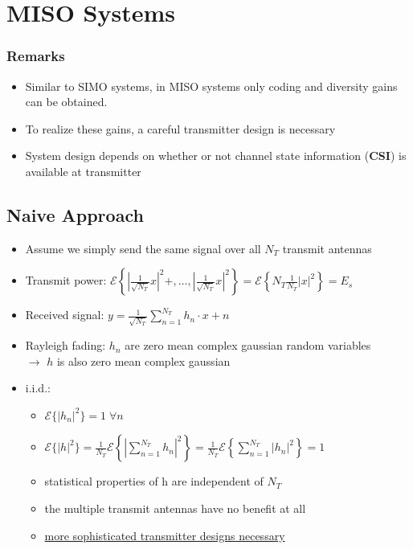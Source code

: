 \documentclass[a4paper, 10pt]{article}
\begin{document}
\section{MISO Systems}
\subsubsection*{Remarks}
	\begin{itemize}
		\item Similar to SIMO systems, in MISO systems only coding and diversity gains can be obtained.
		\item To realize these gains, a careful transmitter design is necessary
		\item System design depends on whether or not channel state information (\textbf{CSI}) is available at transmitter
	\end{itemize}
\subsection{Naive Approach}
\begin{itemize}	
	\item Assume we simply send the same signal over all $N_T$ transmit antennas
\end{itemize}

\begin{itemize}
	\item Transmit power: $\mathcal{E}\left\{\left|\frac{1}{\sqrt{N_T}}x\right|^2+,\dots,\left|\frac{1}{\sqrt{N_T}}x\right|^2\right\}=\mathcal{E}\left\{N_T\frac{1}{N_T}|x|^2\right\}=E_s$
	\item Received signal: $y=\frac{1}{\sqrt{N_T}}\sum\limits_{n=1}^{N_T}h_n\cdot x+n$
	\item Rayleigh fading: $h_n$ are zero mean complex gaussian random variables\\
	$\rightarrow$ $h$ is also zero mean complex gaussian
	\item i.i.d.:
	\begin{itemize}
		\item $\mathcal{E}\{|h_n|^2\}=1\;\forall n$
		\item $\mathcal{E}\{|h|^2\}=\frac{1}{N_T}\mathcal{E}\left\{\left|\sum\limits_{n=1}^{N_T}h_n\right|^2\right\}=\frac{1}{N_T}\mathcal{E}\left\{\sum\limits^{N_T}_{n=1}|h_n|^2\right\}=1$
		\item statistical properties of h are independent of $N_T$
		\item the multiple transmit antennas have no benefit at all
		\item \underline{more sophisticated transmitter designs necessary}
	\end{itemize}
\end{itemize}
\end{document}
